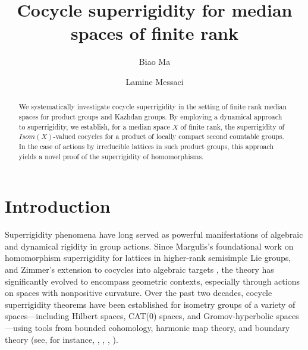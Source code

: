 \documentclass{amsart}
\title{Cocycle superrigidity for median spaces of finite rank}
\author{Biao Ma}
\author{Lamine Messaci  }
\numberwithin{equation}{section}
\theoremstyle{definition}
\begin{document}
 
\begin{abstract}
We systematically investigate cocycle superrigidity in the setting of finite rank median spaces for product groups and Kazhdan groups. By employing a dynamical approach to superrigidity, we establish, for a median space $X$ of finite rank, the superrigidity of $Isom(X)$-valued cocycles for a product of locally compact second countable groups. In the case of actions by irreducible lattices in such product groups, this approach yields a novel proof of the superrigidity of homomorphisms.
\end{abstract}

\maketitle 

\tableofcontents


\section{Introduction}


Superrigidity phenomena have long served as powerful manifestations of algebraic and dynamical rigidity in group actions. Since Margulis’s foundational work on homomorphism superrigidity for lattices in higher-rank semisimple Lie groups\cite{margulis1991discrete}, and Zimmer’s extension to cocycles into algebraic targets \cite{Zimmer}, the theory has significantly evolved to encompass geometric contexts, especially through actions on spaces with nonpositive curvature. Over the past two decades, cocycle superrigidity theorems have been established for isometry groups of a variety of spaces—including Hilbert spaces, CAT(0) spaces, and Gromov-hyperbolic spaces—using tools from bounded cohomology, harmonic map theory, and boundary theory (see, for instance, \cite{Monod}, \cite{Monod-Shalom}, \cite{Shalom-superrigidity}, \cite{BaderFurman}).\par
\end{document}
